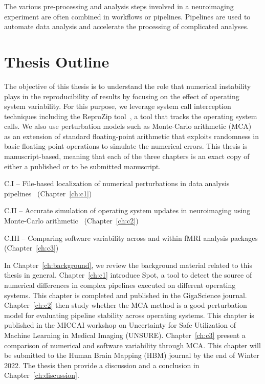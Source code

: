 The various pre-processing and analysis steps involved in a 
neuroimaging experiment are often combined in workflows 
or pipelines. Pipelines are used to automate data analysis and accelerate 
the processing of complicated analyses. 


\section{Thesis Outline}

The objective of this thesis is to understand the role that numerical instability plays in the reproducibility of results
by focusing on the effect of operating system variability.
For this purpose, we leverage system call interception techniques including the
ReproZip tool~\cite{rampin2016reprozip}, a tool that tracks the operating system calls.
We also use perturbation models such as Monte-Carlo arithmetic (MCA)~\cite{Parker1997-qq} 
as an extension of standard floating-point arithmetic that exploits randomness in basic
floating-point operations to simulate the numerical errors. 
This thesis is manuscript-based, meaning that each of the three chapters
is an exact copy of either a published or to be submitted manuscript.

C.I – File-based localization of numerical perturbations in data analysis pipelines~\cite{salari2020spot} (Chapter~\ref{ch:c1})

C.II – Accurate simulation of operating system updates in neuroimaging using Monte-Carlo arithmetic~\cite{salari2021accurate} (Chapter~\ref{ch:c2})


C.III – Comparing software variability across and within fMRI analysis packages (Chapter~\ref{ch:c3})


In Chapter~\ref{ch:background}, we review the background material related to this thesis in general.
Chapter~\ref{ch:c1} introduce Spot, a tool to detect the source of numerical differences in complex pipelines
executed on different operating systems. This chapter is completed and published in the
GigaScience journal. Chapter~\ref{ch:c2} then study whether the MCA method is a good perturbation
model for evaluating pipeline stability across operating systems. This chapter is published
in the MICCAI workshop on Uncertainty for Safe Utilization of Machine Learning in Medical Imaging (UNSURE).
Chapter~\ref{ch:c3} present a comparison of numerical and software variability through MCA.
This chapter will be submitted to the Human Brain Mapping (HBM) journal by the end of Winter 2022.
The thesis then provide a discussion and a conclusion in Chapter~\ref{ch:discussion}.

